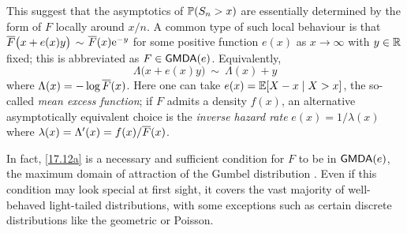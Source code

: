 This suggest that the asymptotics of $\operatorname{{\mathbb P}}(S_n>x)$ are essentially determined by the
form of $F$ locally around $x/n$. A common type of such local behaviour is
that $\overline F\bigl(x+e(x)y\bigr)$ $\sim$ $ \overline F(x)\mathrm{e}^{-y}$ for some positive  function $e(x)$
as $x\to\infty$ with $y\in\mathbb{R}$ fixed; this is abbreviated as $F \in \mathsf{GMDA}(e)$. Equivalently,
\begin{equation}\label{17.12a}
\Lambda\bigl(x+e(x)y\bigr)\ \sim\ \Lambda(x) + y
\end{equation}
where $\Lambda(x)=-\log\overline F(x)$.
Here one can take $e(x)=\operatorname{{\mathbb E}}[X - x \mid X > x]$, the so-called \emph{mean excess function}; if $F$ admits a density $f(x)$,   an alternative asymptotically equivalent choice is the \emph{inverse hazard rate} $e(x) = 1/\lambda(x)$ where $\lambda(x)=\Lambda'(x)=f(x)/\overline F(x)$.

In fact, \eqref{17.12a} is a necessary and sufficient condition for $F$
to be in $\mathsf{GMDA}(e)$, the maximum domain of attraction of the Gumbel distribution \cite{embrechts2013modelling}. Even if this condition may look
special at first sight, it covers the vast majority of well-behaved light-tailed distributions, with
some exceptions such as certain discrete distributions like the geometric or Poisson.


